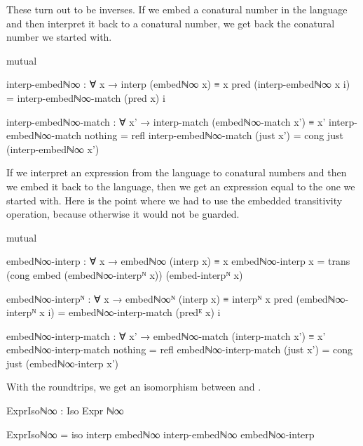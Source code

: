 These turn out to be inverses. If we embed a conatural number in the language
and then interpret it back to a conatural number, we get back the conatural
number we started with.
\begin{code}[hide]
mutual
\end{code}
\begin{code}
  interp-embedℕ∞ : ∀ x → interp (embedℕ∞ x) ≡ x
  pred (interp-embedℕ∞ x i) =
    interp-embedℕ∞-match (pred x) i

  interp-embedℕ∞-match :
    ∀ x' → interp-match (embedℕ∞-match x') ≡ x'
  interp-embedℕ∞-match nothing    = refl
  interp-embedℕ∞-match (just x')  =
    cong just (interp-embedℕ∞ x')
\end{code}
If we interpret an expression from the language to conatural numbers and then we
embed it back to the language, then we get an expression equal to the one we
started with. Here is the point where we had to use the embedded transitivity
operation, because otherwise it would not be guarded.
\begin{code}[hide]
mutual
\end{code}
\begin{code}
  embedℕ∞-interp : ∀ x → embedℕ∞ (interp x) ≡ x
  embedℕ∞-interp x =
    trans
      (cong embed (embedℕ∞-interpᴺ x))
      (embed-interpᴺ x)

  embedℕ∞-interpᴺ :
    ∀ x → embedℕ∞ᴺ (interp x) ≡ interpᴺ x
  pred (embedℕ∞-interpᴺ x i) =
    embedℕ∞-interp-match (predᴱ x) i

  embedℕ∞-interp-match :
    ∀ x' → embedℕ∞-match (interp-match x') ≡ x'
  embedℕ∞-interp-match nothing    = refl
  embedℕ∞-interp-match (just x')  =
    cong just (embedℕ∞-interp x')
\end{code}
With the roundtrips, we get an isomorphism between  and
.
\begin{code}
ExprIsoℕ∞ : Iso Expr ℕ∞
\end{code}
\begin{code}[hide]
ExprIsoℕ∞ = iso interp embedℕ∞ interp-embedℕ∞ embedℕ∞-interp
\end{code}

